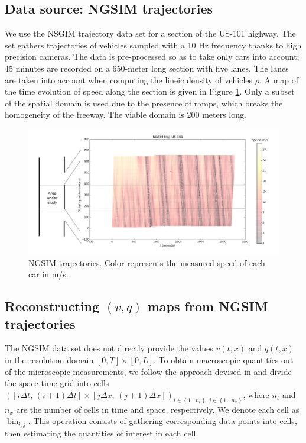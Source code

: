 \documentclass[preprint]{elsarticle}
\DeclareMathOperator{\bin}{bin}
\begin{document}
\subsection{Data source: NGSIM trajectories}

We use the NSGIM trajectory data set for a section of the US-101 highway. The set gathers trajectories of vehicles sampled with a 10 Hz frequency thanks to high precision cameras. The data is pre-processed so as to take only cars into account; 45 minutes are recorded on a 650-meter long section with five lanes. The lanes are taken into account when computing the lineic density of vehicles $\rho$.
A map of the time evolution of speed along the section is given in Figure \ref{fig:NGSIM-trajectories}.
Only a subset of the spatial domain is used due to the presence of ramps, which breaks the homogeneity of the freeway. The viable domain is 200 meters long.

\begin{figure}[H]
\centering
\includegraphics[width=12cm]{Numerics/US-101_all_traj_low_res_mod}
\protect\caption{NGSIM trajectories. Color represents the measured speed of each
car in m/s.}
\label{fig:NGSIM-trajectories}
\end{figure}



\subsection{Reconstructing $(v,q)$ maps from NGSIM trajectories}

The NGSIM data set does not directly provide the values $v(t,x)$
and $q(t,x)$ in the resolution domain $\left[0,T\right]\times\left[0,L\right]$. To obtain macroscopic quantities out of the microscopic measurements, we follow the approach devised in \cite{edie1963discussion} and divide the space-time grid into cells $\left(\left[i\Delta t,\, \left(i+1\right)\Delta t\right]\times\left[j\Delta x, \, (j+1)\Delta x\right]\right)_{i\in\left\{ 1\ldots n_{t}\right\} ,j\in\left\{ 1\ldots n_{x}\right\} }$, where $n_t$ and $n_x$ are the number of cells in time and space, respectively. We denote each cell as $\bin_{i,j}$. This operation consists of gathering corresponding data points into cells, then estimating the quantities of interest in each cell. 
\end{document}
